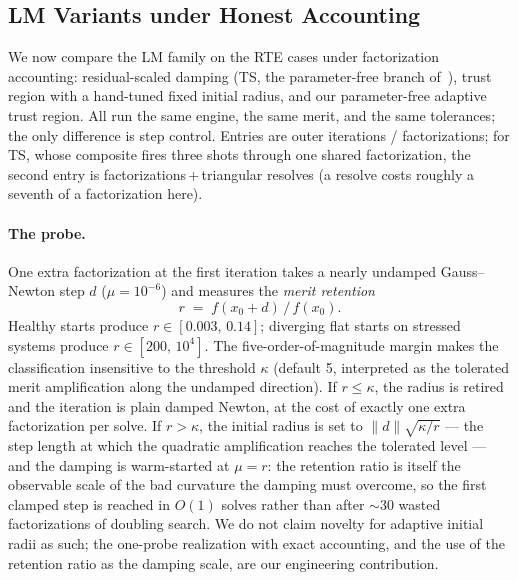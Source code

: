 \documentclass[11pt]{article}
\begin{document}

\subsection{LM Variants under Honest Accounting}

We now compare the LM family on the RTE cases under factorization
accounting: residual-scaled damping (TS, the parameter-free branch
of~\cite{derakhshandeh2018}), trust region with a hand-tuned fixed initial
radius, and our parameter-free adaptive trust region. All run the same
engine, the same merit, and the same tolerances; the only difference is
step control. Entries are outer iterations / factorizations; for TS, whose
composite fires three shots through one shared factorization, the second
entry is factorizations\,+\,triangular resolves (a resolve costs roughly a
seventh of a factorization here).

\paragraph{The probe.} One extra factorization at the first iteration takes
a nearly undamped Gauss--Newton step $d$ ($\mu = 10^{-6}$) and measures the
\emph{merit retention}
\begin{equation}
  r \;=\; f(x_0 + d) \,/\, f(x_0).
\end{equation}
Healthy starts produce $r \in [0.003,\,0.14]$; diverging flat starts on
stressed systems produce $r \in [200,\,10^4]$. The five-order-of-magnitude
margin makes the classification insensitive to the threshold $\kappa$
(default 5, interpreted as the tolerated merit amplification along the
undamped direction). If $r \le \kappa$, the radius is retired and the
iteration is plain damped Newton, at the cost of exactly one extra
factorization per solve. If $r > \kappa$, the initial radius is set to
$\|d\|\sqrt{\kappa/r}$ --- the step length at which the quadratic
amplification reaches the tolerated level --- and the damping is
warm-started at $\mu = r$: the retention ratio is itself the observable
scale of the bad curvature the damping must overcome, so the first clamped
step is reached in $O(1)$ solves rather than after $\sim$30 wasted
factorizations of doubling search. We do not claim novelty for adaptive
initial radii as such; the one-probe realization with
exact accounting, and the use of the retention ratio as the damping scale,
are our engineering contribution.
\end{document}
